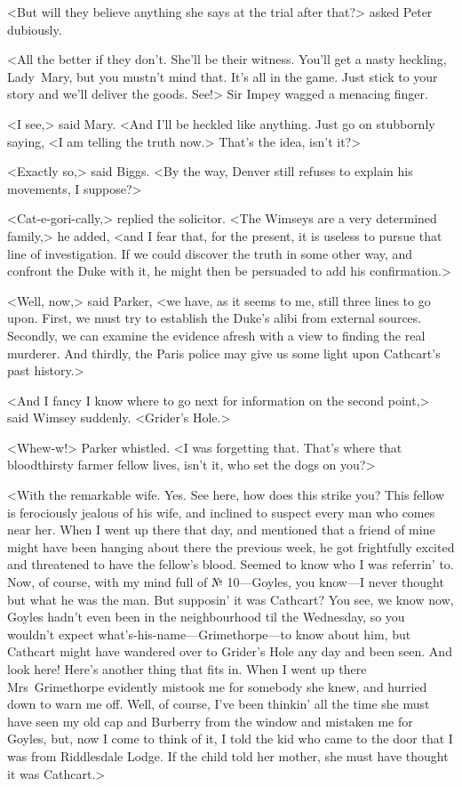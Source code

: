 <But will they believe anything she says at the trial after that?> asked Peter dubiously.

<All the better if they don't. She'll be their witness. You'll get a nasty heckling, Lady~Mary, but you mustn't mind that. It's all in the game. Just stick to your story and we'll deliver the goods. See!> Sir Impey wagged a menacing finger.

<I see,> said Mary. <And I'll be heckled like anything. Just go on stubbornly saying, <I am telling the truth now.> That's the idea, isn't it?>

<Exactly so,> said Biggs. <By the way, Denver still refuses to explain his movements, I suppose?>

<Cat-e-gori-cally,> replied the solicitor. <The Wimseys are a very determined family,> he added, <and I fear that, for the present, it is useless to pursue that line of investigation. If we could discover the truth in some other way, and confront the Duke with it, he might then be persuaded to add his confirmation.>

<Well, now,> said Parker, <we have, as it seems to me, still three lines to go upon. First, we must try to establish the Duke's alibi from external sources. Secondly, we can examine the evidence afresh with a view to finding the real murderer. And thirdly, the Paris police may give us some light upon Cathcart's past history.>

<And I fancy I know where to go next for information on the second point,> said Wimsey suddenly. <Grider's Hole.>

<Whew-w!> Parker whistled. <I was forgetting that. That's where that bloodthirsty farmer fellow lives, isn't it, who set the dogs on you?>

<With the remarkable wife. Yes. See here, how does this strike you?  This fellow is ferociously jealous of his wife, and inclined to suspect every man who comes near her. When I went up there that day, and mentioned that a friend of mine might have been hanging about there the previous week, he got frightfully excited and threatened to have the fellow's blood. Seemed to know who I was referrin' to. Now, of course, with my mind full of № 10—Goyles, you know—I never thought but what he was the man. But supposin' it was Cathcart? You see, we know now, Goyles hadn't even been in the neighbourhood til the Wednesday, so you wouldn't expect what's-his-name—Grimethorpe—to know about him, but Cathcart might have wandered over to Grider's Hole any day and been seen. And look here! Here's another thing that fits in. When I went up there Mrs~Grimethorpe evidently mistook me for somebody she knew, and hurried down to warn me off. Well, of course, I've been thinkin' all the time she must have seen my old cap and Burberry from the window and mistaken me for Goyles, but, now I come to think of it, I told the kid who came to the door that I was from Riddlesdale Lodge. If the child told her mother, she must have thought it was Cathcart.>

